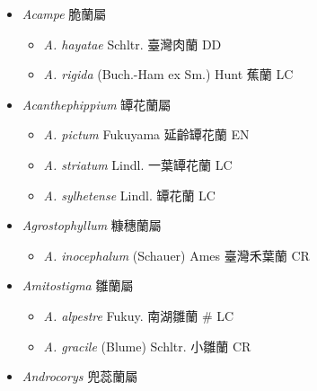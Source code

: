 
  \begin{itemize}
 \item[] \textit{Acampe} 脆蘭屬
                                
  \begin{itemize}
        \item[] \textit{A. hayatae} Schltr.  臺灣肉蘭   DD
        \item[] \textit{A. rigida} (Buch.-Ham ex Sm.) Hunt  蕉蘭   LC
  \end{itemize}
 \item[] \textit{Acanthephippium} 罈花蘭屬
                                
  \begin{itemize}
        \item[] \textit{A. pictum} Fukuyama  延齡罈花蘭   EN
        \item[] \textit{A. striatum} Lindl.  一葉罈花蘭   LC
        \item[] \textit{A. sylhetense} Lindl.  罈花蘭   LC
  \end{itemize}
 \item[] \textit{Agrostophyllum} 糠穗蘭屬
                                
  \begin{itemize}
        \item[] \textit{A. inocephalum} (Schauer) Ames  臺灣禾葉蘭   CR
  \end{itemize}
 \item[] \textit{Amitostigma} 雛蘭屬
                                
  \begin{itemize}
        \item[] \textit{A. alpestre} Fukuy.  南湖雛蘭  \# LC
        \item[] \textit{A. gracile} (Blume) Schltr.  小雛蘭   CR
  \end{itemize}
 \item[] \textit{Androcorys} 兜蕊蘭屬
                                

\end{itemize}
